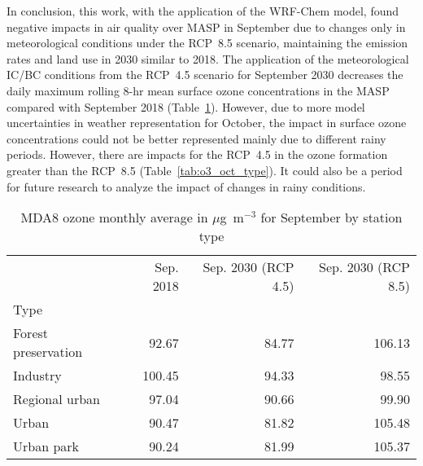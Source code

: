 In conclusion, this work, with the application of the WRF-Chem model, found negative impacts in air quality over MASP in September due to changes only in meteorological conditions under the RCP~8.5 scenario, maintaining the emission rates and land use in 2030 similar to 2018.
The application of the meteorological IC/BC conditions from the RCP~4.5 scenario for September 2030 decreases the daily maximum rolling 8-hr mean surface ozone concentrations in the MASP compared with September 2018 (Table~\ref{tab:o3_sep_type}). 
However, due to more model uncertainties in weather representation for October, the impact in surface ozone concentrations could not be better represented mainly due to different rainy periods.
However, there are impacts for the RCP~4.5 in the ozone formation greater than the RCP~8.5 (Table~\ref{tab:o3_oct_type}). 
It could also be a period for future research to analyze the impact of changes in rainy conditions.

\begin{table}
\centering
\caption{MDA8 ozone monthly average in $\mu$g~m$^{-3}$ for September by station type}
\label{tab:o3_sep_type}
\begin{tabular}{lrrr}
\toprule
{} &  Sep. 2018 &  Sep. 2030 (RCP 4.5) &  Sep. 2030 (RCP 8.5) \\
Type                &            &                      &                      \\
\midrule
Forest preservation &      92.67 &                84.77 &               106.13 \\
Industry            &     100.45 &                94.33 &                98.55 \\
Regional urban      &      97.04 &                90.66 &                99.90 \\
Urban               &      90.47 &                81.82 &               105.48 \\
Urban park          &      90.24 &                81.99 &               105.37 \\
\bottomrule
\end{tabular}
\end{table}

